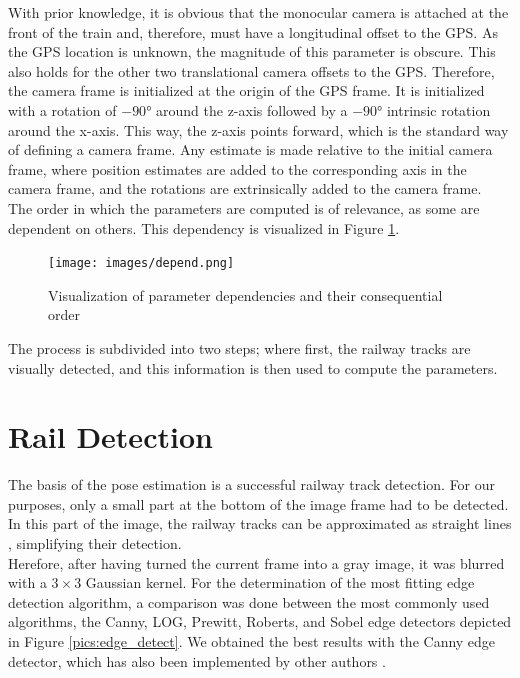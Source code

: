 With prior knowledge, it is obvious that the monocular camera is attached at the front of the train and, therefore, must have a longitudinal offset to the GPS. As the GPS location is unknown, the magnitude of this parameter is obscure. This also holds for the other two translational camera offsets to the GPS. Therefore, the camera frame is initialized at the origin of the GPS frame. It is initialized with a rotation of $-90$° around the z-axis followed by a $-90$° intrinsic rotation around the x-axis. This way, the z-axis points forward, which is the standard way of defining a camera frame. Any estimate is made relative to the initial camera frame, where position estimates are added to the corresponding axis in the camera frame, and the rotations are extrinsically added to the camera frame. \\

The order in which the parameters are computed is of relevance, as some are dependent on others. This dependency is visualized in Figure \ref{pics:dep}. 

\begin{figure}[h!]
   \centering
   \texttt{[image: images/depend.png]}
   \caption{Visualization of parameter dependencies and their consequential order}
   \label{pics:dep}
\end{figure}
The process is subdivided into two steps; where first, the railway tracks are visually detected, and this information is then used to compute the parameters.







\newpage
\section{Rail Detection}
The basis of the pose estimation is a successful railway track detection. For our purposes, only a small part at the bottom of the image frame had to be detected. In this part of the image, the railway tracks can be approximated as straight lines \cite{nassu2011rail}, simplifying their detection.\\

Herefore, after having turned the current frame into a gray image, it was blurred with a $3 \times 3$ Gaussian kernel. For the determination of the most fitting edge detection algorithm, a comparison was done between the most commonly used algorithms, the Canny, LOG, Prewitt, Roberts, and Sobel edge detectors depicted in Figure \ref{pics:edge_detect}. We obtained the best results with the Canny edge detector, which has also been implemented by other authors \citep{namazi2019using}. 


